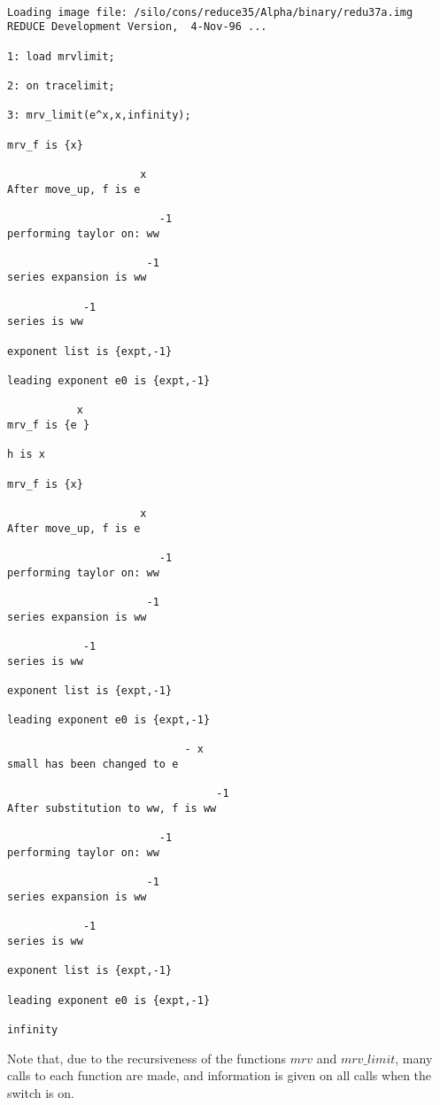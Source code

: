 \begin{verbatim}

Loading image file: /silo/cons/reduce35/Alpha/binary/redu37a.img
REDUCE Development Version,  4-Nov-96 ...

1: load mrvlimit;

2: on tracelimit;

3: mrv_limit(e^x,x,infinity);

mrv_f is {x}

                     x
After move_up, f is e

                        -1
performing taylor on: ww

                      -1
series expansion is ww

            -1
series is ww

exponent list is {expt,-1}

leading exponent e0 is {expt,-1}

           x
mrv_f is {e }

h is x

mrv_f is {x}

                     x
After move_up, f is e

                        -1
performing taylor on: ww

                      -1
series expansion is ww

            -1
series is ww

exponent list is {expt,-1}

leading exponent e0 is {expt,-1}

                            - x
small has been changed to e

                                 -1
After substitution to ww, f is ww

                        -1
performing taylor on: ww

                      -1
series expansion is ww

            -1
series is ww

exponent list is {expt,-1}

leading exponent e0 is {expt,-1}

infinity
\end{verbatim}
\vspace{10 mm}
Note that, due to the recursiveness of the functions $mrv$ and $mrv\_limit$, many calls to each function are made, and information is given on all calls when the  switch is on.
